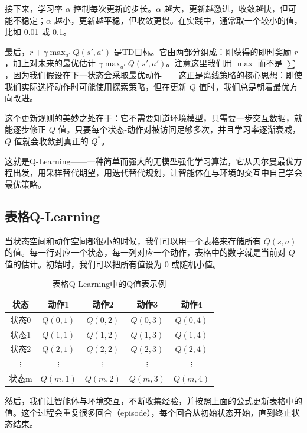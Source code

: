\documentclass[lang=cn,zihao=-4,a4paper,fontset=windows]{beautybook}
\begin{document}
接下来，学习率 \(\alpha\) 控制每次更新的步长。\(\alpha\) 越大，更新越激进，收敛越快，但可能不稳定；\(\alpha\) 越小，更新越平稳，但收敛更慢。在实践中，通常取一个较小的值，比如 0.01 或 0.1。

最后，\(r + \gamma \max_{a'} Q(s',a')\) 是TD目标。它由两部分组成：刚获得的即时奖励 \(r\)，加上对未来的最优估计 \(\gamma \max_{a'} Q(s',a')\)。注意这里我们用 \(\max\) 而不是 \(\sum\)，因为我们假设在下一状态会采取最优动作——这正是离线策略的核心思想：即使我们实际选择动作时可能使用探索策略，但在更新 \(Q\) 值时，我们总是朝着最优方向改进。

这个更新规则的美妙之处在于：它不需要知道环境模型，只需要一步交互数据，就能逐步修正 \(Q\) 值。只要每个状态-动作对被访问足够多次，并且学习率逐渐衰减，\(Q\) 值就会收敛到真正的 \(Q^*\)。

这就是Q-Learning——一种简单而强大的无模型强化学习算法，它从贝尔曼最优方程出发，用采样替代期望，用迭代替代规划，让智能体在与环境的交互中自己学会最优策略。

\subsection{表格Q-Learning}

当状态空间和动作空间都很小的时候，我们可以用一个表格来存储所有 \(Q(s,a)\) 的值。每一行对应一个状态，每一列对应一个动作，表格中的数字就是当前对 \(Q\) 值的估计。初始时，我们可以把所有值设为 0 或随机小值。

\begin{table}[h]
\centering
\caption{表格Q-Learning中的Q值表示例}
\begin{tabular}{c|cccc}
\hline
\textbf{状态} & \textbf{动作1} & \textbf{动作2} & \textbf{动作3} & \textbf{动作4} \\
\hline
状态0 & $Q(0,1)$ & $Q(0,2)$ & $Q(0,3)$ & $Q(0,4)$ \\
状态1 & $Q(1,1)$ & $Q(1,2)$ & $Q(1,3)$ & $Q(1,4)$ \\
状态2 & $Q(2,1)$ & $Q(2,2)$ & $Q(2,3)$ & $Q(2,4)$ \\
$\vdots$ & $\vdots$ & $\vdots$ & $\vdots$ & $\vdots$ \\
状态m & $Q(m,1)$ & $Q(m,2)$ & $Q(m,3)$ & $Q(m,4)$ \\
\hline
\end{tabular}
\end{table}

然后，我们让智能体与环境交互，不断收集经验，并按照上面的公式更新表格中的值。这个过程会重复很多回合（episode），每个回合从初始状态开始，直到终止状态结束。
\end{document}
